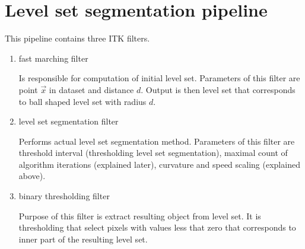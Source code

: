 \section{Level set segmentation pipeline}

This pipeline contains three ITK filters.
\begin{enumerate}
  \item{fast marching filter}
  \par
  Is responsible for computation of initial level set. Parameters of this filter are point $\vec{x}$ in dataset and distance $d$. Output is then level set that corresponds to ball shaped level set with radius $d$.

  \item{level set segmentation filter}
  \par
  Performs actual level set segmentation method. Parameters of this filter are threshold interval (thresholding level set segmentation),  maximal count of algorithm iterations (explained later), curvature and speed scaling (explained above).

  \item{binary thresholding filter}
  \par
  Purpose of this filter is extract resulting object from level set. It is thresholding that select pixels with values less that zero that corresponds to inner part of the resulting level set.
\end{enumerate}


